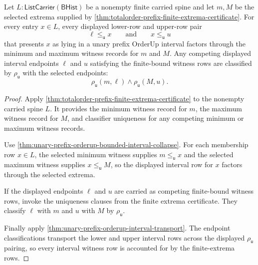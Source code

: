 \begin{theorem}
\label{thm:unary-prefix-orderup-interval-witness-coverage}
Let $L:\mathsf{ListCarrier}(\mathsf{BHist})$ be a nonempty finite carried spine
and let $m,M$ be the selected extrema supplied by
\autoref{thm:totalorder-prefix-finite-extrema-certificate}.  For every entry
$x\in L$, every displayed lower-row and upper-row pair
$$
\ell\le_{\mathsf{u}}x
\qquad
\text{and}
\qquad
x\le_{\mathsf{u}}u
$$
that presents $x$ as lying in a unary prefix OrderUp interval factors through
the minimum and maximum witness records for $m$ and $M$.  Any competing
displayed interval endpoints $\ell$ and $u$ satisfying the finite-bound witness
rows are classified by $\rho_{\mathsf{u}}$ with the selected endpoints:
$$
\rho_{\mathsf{u}}(m,\ell)
\land
\rho_{\mathsf{u}}(M,u).
$$
\end{theorem}
\begin{proof}
Apply \autoref{thm:totalorder-prefix-finite-extrema-certificate} to the
nonempty carried spine $L$.  It provides the minimum witness record for $m$,
the maximum witness record for $M$, and classifier uniqueness for any
competing minimum or maximum witness records.

Use \autoref{thm:unary-prefix-orderup-bounded-interval-collapse}.  For each
membership row $x\in L$, the selected minimum witness supplies
$m\le_{\mathsf{u}}x$ and the selected maximum witness supplies
$x\le_{\mathsf{u}}M$, so the displayed interval row for $x$ factors through
the selected extrema.

If the displayed endpoints $\ell$ and $u$ are carried as competing finite-bound
witness rows, invoke the uniqueness clauses from the finite extrema
certificate.  They classify $\ell$ with $m$ and $u$ with $M$ by
$\rho_{\mathsf{u}}$.

Finally apply \autoref{thm:unary-prefix-orderup-interval-transport}.  The
endpoint classifications transport the lower and upper interval rows across
the displayed $\rho_{\mathsf{u}}$ pairing, so every interval witness row is
accounted for by the finite-extrema rows.
\end{proof}
